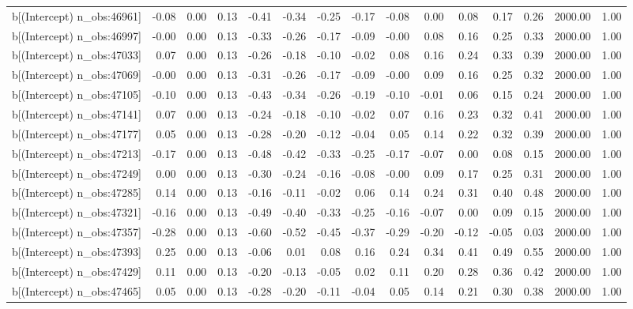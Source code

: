 \begin{table}[ht]
\begin{tabular}{rrrrrrrrrrrrrrr}
  b[(Intercept) n\_obs:46961] & -0.08 & 0.00 & 0.13 & -0.41 & -0.34 & -0.25 & -0.17 & -0.08 & 0.00 & 0.08 & 0.17 & 0.26 & 2000.00 & 1.00 \\ 
  b[(Intercept) n\_obs:46997] & -0.00 & 0.00 & 0.13 & -0.33 & -0.26 & -0.17 & -0.09 & -0.00 & 0.08 & 0.16 & 0.25 & 0.33 & 2000.00 & 1.00 \\ 
  b[(Intercept) n\_obs:47033] & 0.07 & 0.00 & 0.13 & -0.26 & -0.18 & -0.10 & -0.02 & 0.08 & 0.16 & 0.24 & 0.33 & 0.39 & 2000.00 & 1.00 \\ 
  b[(Intercept) n\_obs:47069] & -0.00 & 0.00 & 0.13 & -0.31 & -0.26 & -0.17 & -0.09 & -0.00 & 0.09 & 0.16 & 0.25 & 0.32 & 2000.00 & 1.00 \\ 
  b[(Intercept) n\_obs:47105] & -0.10 & 0.00 & 0.13 & -0.43 & -0.34 & -0.26 & -0.19 & -0.10 & -0.01 & 0.06 & 0.15 & 0.24 & 2000.00 & 1.00 \\ 
  b[(Intercept) n\_obs:47141] & 0.07 & 0.00 & 0.13 & -0.24 & -0.18 & -0.10 & -0.02 & 0.07 & 0.16 & 0.23 & 0.32 & 0.41 & 2000.00 & 1.00 \\ 
  b[(Intercept) n\_obs:47177] & 0.05 & 0.00 & 0.13 & -0.28 & -0.20 & -0.12 & -0.04 & 0.05 & 0.14 & 0.22 & 0.32 & 0.39 & 2000.00 & 1.00 \\ 
  b[(Intercept) n\_obs:47213] & -0.17 & 0.00 & 0.13 & -0.48 & -0.42 & -0.33 & -0.25 & -0.17 & -0.07 & 0.00 & 0.08 & 0.15 & 2000.00 & 1.00 \\ 
  b[(Intercept) n\_obs:47249] & 0.00 & 0.00 & 0.13 & -0.30 & -0.24 & -0.16 & -0.08 & -0.00 & 0.09 & 0.17 & 0.25 & 0.31 & 2000.00 & 1.00 \\ 
  b[(Intercept) n\_obs:47285] & 0.14 & 0.00 & 0.13 & -0.16 & -0.11 & -0.02 & 0.06 & 0.14 & 0.24 & 0.31 & 0.40 & 0.48 & 2000.00 & 1.00 \\ 
  b[(Intercept) n\_obs:47321] & -0.16 & 0.00 & 0.13 & -0.49 & -0.40 & -0.33 & -0.25 & -0.16 & -0.07 & 0.00 & 0.09 & 0.15 & 2000.00 & 1.00 \\ 
  b[(Intercept) n\_obs:47357] & -0.28 & 0.00 & 0.13 & -0.60 & -0.52 & -0.45 & -0.37 & -0.29 & -0.20 & -0.12 & -0.05 & 0.03 & 2000.00 & 1.00 \\ 
  b[(Intercept) n\_obs:47393] & 0.25 & 0.00 & 0.13 & -0.06 & 0.01 & 0.08 & 0.16 & 0.24 & 0.34 & 0.41 & 0.49 & 0.55 & 2000.00 & 1.00 \\ 
  b[(Intercept) n\_obs:47429] & 0.11 & 0.00 & 0.13 & -0.20 & -0.13 & -0.05 & 0.02 & 0.11 & 0.20 & 0.28 & 0.36 & 0.42 & 2000.00 & 1.00 \\ 
  b[(Intercept) n\_obs:47465] & 0.05 & 0.00 & 0.13 & -0.28 & -0.20 & -0.11 & -0.04 & 0.05 & 0.14 & 0.21 & 0.30 & 0.38 & 2000.00 & 1.00 \\ 

\end{tabular}
\end{table}
